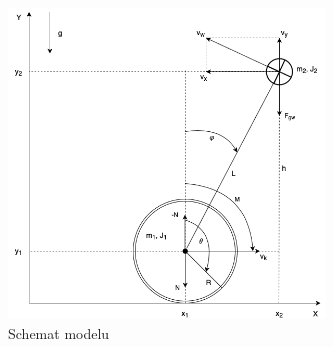     \begin{figure}[h!]
	    \centering
	    \includegraphics[width=0.75\textwidth]{Rysunki/Rozdzial02/Schemat_modelu_dynamiki.png}
	    \caption{Schemat modelu}
	    \label{Schemat modelu}
	\end{figure}
	
	\newpage
	
